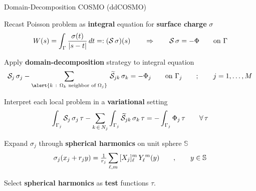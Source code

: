 \begin{frame}{Domain-Decomposition COSMO (ddCOSMO)}

\begin{wideitemize}

\item Recast Poisson problem as {\bf integral} equation for {\bf surface charge} $\sigma$
\[
W(s) = \int_\Gamma \frac{\sigma(t)}{|s - t|} \, dt =:  (\mathcal{S} \, \sigma) (s)  \qquad \Rightarrow \qquad \mathcal{S} \, \sigma = -\Phi \qquad \text{on }\Gamma \displaybump
\]
\item Apply {\bf domain-decomposition} strategy to integral equation
\[
\mathcal{S}_j \, \sigma_j  - \sum_{\alert{k \:\: : \:\: \Omega_k \text{ neighbor of }\Omega_j }} \: \widetilde{\mathcal{S}}_{jk} \, \sigma_k = -\Phi_j \qquad \text{on }\Gamma_j \qquad ; \qquad  j = 1, \ldots , M \displaybump
\]
\item Interpret each local problem in a {\bf variational} setting
\[
\int_{\Gamma_j }\mathcal{S}_j \, \sigma_j \, \tau  - \sum_{k \, \in \,  N_j } \int_{\Gamma_j } \widetilde{\mathcal{S}}_{jk} \, \sigma_k \, \tau = - \int_{\Gamma_j }\Phi_j \, \tau \qquad \forall \, \tau \displaybump
\]
\item Expand $\sigma_j$ through {\bf spherical harmonics} on unit sphere $\mathbb{S}$
\[
\sigma_j(x_j + r_j y) = \tfrac{1}{r_j}  \sum_{\ell,m}\, [X_j]_\ell^m \, Y_\ell^{\,m}(y) \qquad , \qquad y \in \mathbb{S} \displaybump
\]
\item Select {\bf spherical harmonics} as {\bf test} functions $\tau$.

\end{wideitemize}

%


\end{frame}

